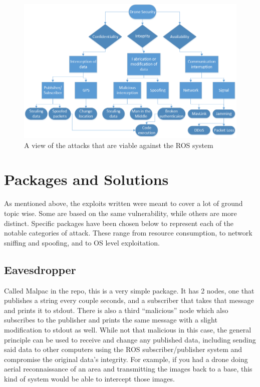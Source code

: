 \documentclass[IEEEtran,letterpaper,10pt,notitlepage,draftclsnofoot]{article}
\begin{document}
\begin{figure}[H]
    \centering
    \includegraphics[width=\textwidth]{model}
    \caption{A view of the attacks that are viable against the ROS system}
\end{figure}

\section{Packages and Solutions}
As mentioned above, the exploits written were meant to cover a lot of ground topic wise.
Some are based on the same vulnerability, while others are more distinct.
Specific packages have been chosen below to represent each of the notable categories of attack.
These range from resource consumption, to network sniffing and spoofing, and to OS level exploitation.

\subsection{Eavesdropper}
Called Malpac in the repo, this is a very simple package. It has 2 nodes, one that publishes a string every couple seconds, and 
a subscriber that takes that message and prints it to stdout. There is also a third “malicious” node which also subscribes to 
the publisher and prints the same message with a slight modification to stdout as well. While not that malicious in this case, 
the general principle can be used to receive and change any published data, including sending said data to other computers 
using the ROS subscriber/publisher system and compromise the original data’s integrity.
For example, if you had a drone doing aerial reconnaissance of an area and transmitting the images back to a base, this kind of 
system would be able to intercept those images.
\end{document}
